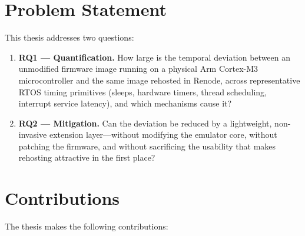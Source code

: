 \section{Problem Statement}
\label{sec:intro:problem}

This thesis addresses two questions:

\begin{enumerate}
  \item \textbf{RQ1 --- Quantification.} How large is the temporal
        deviation between an unmodified firmware image running on a
        physical Arm Cortex-M3 microcontroller and the same image
        rehosted in Renode, across representative RTOS timing
        primitives (sleeps, hardware timers, thread scheduling,
        interrupt service latency), and which mechanisms cause it?
  \item \textbf{RQ2 --- Mitigation.} Can the deviation be reduced by a
        lightweight, non-invasive extension layer---without modifying
        the emulator core, without patching the firmware, and without
        sacrificing the usability that makes rehosting attractive in
        the first place?
\end{enumerate}

\section{Contributions}
\label{sec:intro:contributions}

The thesis makes the following contributions:

